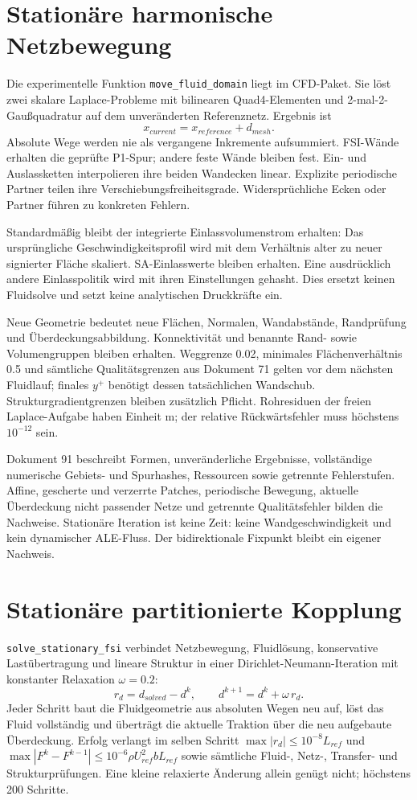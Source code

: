 \section{Stationäre harmonische Netzbewegung}
Die experimentelle Funktion \texttt{move\_fluid\_domain} liegt im CFD-Paket.
Sie löst zwei skalare Laplace-Probleme mit bilinearen Quad4-Elementen und
2-mal-2-Gaußquadratur auf dem unveränderten Referenznetz. Ergebnis ist
\[
x_{current}=x_{reference}+d_{mesh}.
\]
Absolute Wege werden nie als vergangene Inkremente aufsummiert. FSI-Wände
erhalten die geprüfte P1-Spur; andere feste Wände bleiben fest. Ein- und
Auslassketten interpolieren ihre beiden Wandecken linear. Explizite periodische
Partner teilen ihre Verschiebungsfreiheitsgrade. Widersprüchliche Ecken oder
Partner führen zu konkreten Fehlern.

Standardmäßig bleibt der integrierte Einlassvolumenstrom erhalten: Das
ursprüngliche Geschwindigkeitsprofil wird mit dem Verhältnis alter zu neuer
signierter Fläche skaliert. SA-Einlasswerte bleiben erhalten. Eine ausdrücklich
andere Einlasspolitik wird mit ihren Einstellungen gehasht. Dies ersetzt keinen
Fluidsolve und setzt keine analytischen Druckkräfte ein.

Neue Geometrie bedeutet neue Flächen, Normalen, Wandabstände, Randprüfung und
Überdeckungsabbildung. Konnektivität und benannte Rand- sowie Volumengruppen
bleiben erhalten. Weggrenze 0.02, minimales Flächenverhältnis 0.5 und sämtliche
Qualitätsgrenzen aus Dokument 71 gelten vor dem nächsten Fluidlauf; finales
\(y^+\) benötigt dessen tatsächlichen Wandschub. Strukturgradientgrenzen bleiben
zusätzlich Pflicht. Rohresiduen der freien Laplace-Aufgabe haben Einheit m;
der relative Rückwärtsfehler muss höchstens \(10^{-12}\) sein.

Dokument 91 beschreibt Formen, unveränderliche Ergebnisse, vollständige
numerische Gebiets- und Spurhashes, Ressourcen sowie getrennte Fehlerstufen.
Affine, gescherte und verzerrte Patches, periodische Bewegung, aktuelle
Überdeckung nicht passender Netze und getrennte Qualitätsfehler bilden die
Nachweise. Stationäre Iteration ist keine Zeit: keine Wandgeschwindigkeit und
kein dynamischer ALE-Fluss. Der bidirektionale Fixpunkt bleibt ein eigener Nachweis.

\section{Stationäre partitionierte Kopplung}
\texttt{solve\_stationary\_fsi} verbindet Netzbewegung, Fluidlösung,
konservative Lastübertragung und lineare Struktur in einer
Dirichlet-Neumann-Iteration mit konstanter Relaxation \(\omega=0.2\):
\[
r_d=d_{solved}-d^k,\qquad d^{k+1}=d^k+\omega\,r_d .
\]
Jeder Schritt baut die Fluidgeometrie aus absoluten Wegen neu auf, löst das
Fluid vollständig und überträgt die aktuelle Traktion über die neu aufgebaute
Überdeckung. Erfolg verlangt im selben Schritt
\(\max|r_d|\le 10^{-8}L_{ref}\) und
\(\max|F^k-F^{k-1}|\le 10^{-6}\rho U_{ref}^2 bL_{ref}\) sowie sämtliche
Fluid-, Netz-, Transfer- und Strukturprüfungen. Eine kleine relaxierte
Änderung allein genügt nicht; höchstens 200 Schritte.

